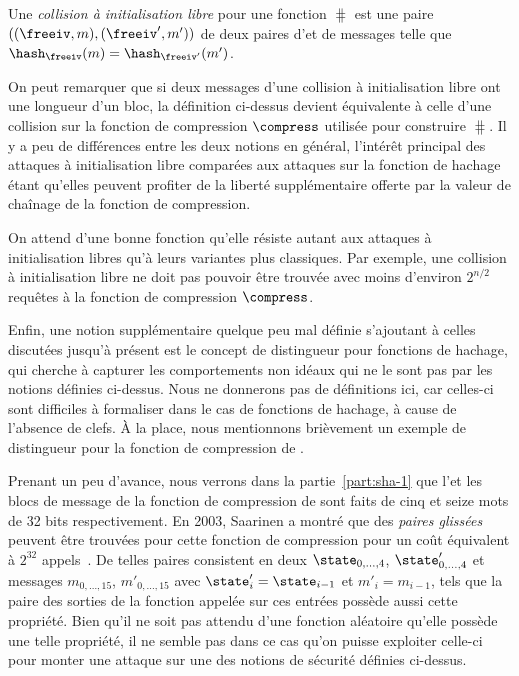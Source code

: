 \begin{fdefi}
Une \emph{collision à initialisation libre}
pour une fonction \merkdam
$\hash$ est une paire $((\freeiv,m), (\freeiv',m'))$
de deux paires d'\iv et de messages telle que $\hash_\freeiv(m) = \hash_{\freeiv'}(m')$.
\end{fdefi}

On peut remarquer que si deux messages d'une collision à initialisation libre ont une longueur d'un bloc, la définition ci-dessus devient équivalente à celle
d'une collision sur la fonction de compression
$\compress$ utilisée pour construire $\hash$.
Il y a peu de différences entre les deux notions en général, l'intérêt principal des
attaques à initialisation libre comparées aux attaques sur la fonction de hachage étant qu'elles
peuvent profiter de la liberté supplémentaire offerte par la valeur de chaînage de la fonction de compression.

On attend d'une bonne fonction qu'elle résiste autant aux attaques à initialisation libres qu'à leurs variantes plus classiques. Par exemple,
une collision à initialisation libre ne doit pas pouvoir être trouvée avec moins d'environ $2^{n/2}$ requêtes à la fonction de compression $\compress$.

\bigskip

Enfin, une notion supplémentaire quelque peu mal définie s'ajoutant à celles discutées jusqu'à présent est le concept de distingueur pour fonctions de hachage,
qui cherche à capturer les comportements non idéaux qui ne le sont pas par les notions définies ci-dessus. Nous ne donnerons pas de définitions ici,
car celles-ci sont difficiles à formaliser dans le cas de fonctions de hachage, à cause de l'absence de clefs. À la place, nous mentionnons brièvement
un exemple de distingueur pour la fonction de compression de \shaone.

Prenant un peu d'avance, nous verrons dans la partie~\ref{part:sha-1} que l'\iv et les blocs de message  de la fonction
de compression de \shaone sont faits de cinq et seize mots de 32 bits respectivement.
En 2003, Saarinen a montré que des \emph{paires glissées} peuvent être trouvées pour cette fonction de compression pour un coût
équivalent à $2^{32}$ appels~\cite{DBLP:conf/fse/Saarinen03}.
De telles paires consistent en deux
\ivs $\state_{0,\ldots,4}$, $\state'_{0,\ldots,4}$ et messages $m_{0,\ldots,15}$,
$m'_{0,\ldots,15}$ avec $\state'_i = \state_{i-1}$ et $m'_i = m_{i-1}$,
tels que la paire des sorties de la fonction appelée sur ces entrées possède aussi cette propriété.
Bien qu'il ne soit pas attendu d'une fonction aléatoire qu'elle possède une telle propriété,
il ne semble pas dans ce cas qu'on puisse exploiter celle-ci pour
monter une attaque sur une des notions de sécurité définies ci-dessus.


